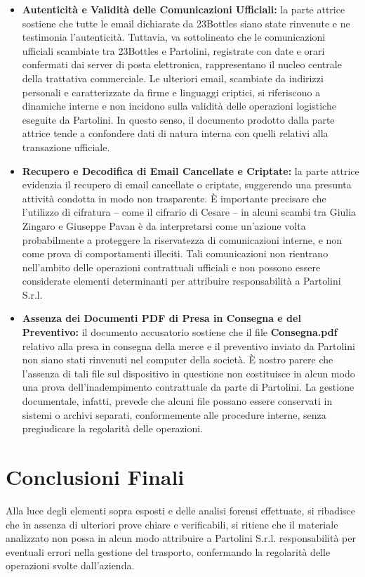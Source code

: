 \documentclass[a4paper,12pt]{report}
\begin{document}
\begin{itemize}
    \item \textbf{Autenticità e Validità delle Comunicazioni Ufficiali:}  
    la parte attrice sostiene che tutte le email dichiarate da 23Bottles siano state rinvenute e ne testimonia l'autenticità. Tuttavia, va sottolineato che le comunicazioni ufficiali scambiate tra 23Bottles e Partolini, registrate con date e orari confermati dai server di posta elettronica, rappresentano il nucleo centrale della trattativa commerciale. Le ulteriori email, scambiate da indirizzi personali e caratterizzate da firme e linguaggi criptici, si riferiscono a dinamiche interne e non incidono sulla validità delle operazioni logistiche eseguite da Partolini. In questo senso, il documento prodotto dalla parte attrice tende a confondere dati di natura interna con quelli relativi alla transazione ufficiale.

    \item \textbf{Recupero e Decodifica di Email Cancellate e Criptate:}  
    la parte attrice evidenzia il recupero di email cancellate o criptate, suggerendo una presunta attività condotta in modo non trasparente. È importante precisare che l'utilizzo di cifratura -- come il cifrario di Cesare -- in alcuni scambi tra Giulia Zingaro e Giuseppe Pavan è da interpretarsi come un'azione volta probabilmente a proteggere la riservatezza di comunicazioni interne, e non come prova di comportamenti illeciti. Tali comunicazioni non rientrano nell'ambito delle operazioni contrattuali ufficiali e non possono essere considerate elementi determinanti per attribuire responsabilità a Partolini S.r.l.

    \item \textbf{Assenza dei Documenti PDF di Presa in Consegna e del Preventivo:}  
    il documento accusatorio sostiene che il file \textbf{Consegna.pdf} relativo alla presa in consegna della merce e il preventivo inviato da Partolini non siano stati rinvenuti nel computer della società. È nostro parere che l'assenza di tali file sul dispositivo in questione non costituisce in alcun modo una prova dell'inadempimento contrattuale da parte di Partolini. La gestione documentale, infatti, prevede che alcuni file possano essere conservati in sistemi o archivi separati, conformemente alle procedure interne, senza pregiudicare la regolarità delle operazioni.
\end{itemize}

\section{Conclusioni Finali}
Alla luce degli elementi sopra esposti e delle analisi forensi effettuate, si ribadisce che in assenza di ulteriori prove chiare e verificabili, si ritiene che il materiale analizzato non possa in alcun modo attribuire a Partolini S.r.l. responsabilità per eventuali errori nella gestione del trasporto, confermando la regolarità delle operazioni svolte dall’azienda.
\end{document}
